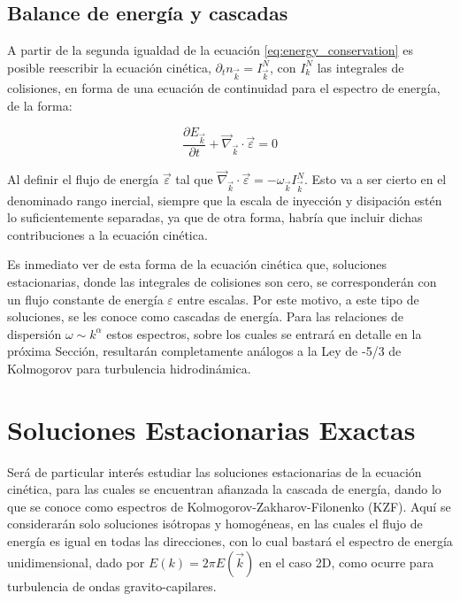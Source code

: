 \subsection{Balance de energía y cascadas} 
A partir de la segunda igualdad de la ecuación \eqref{eq:energy_conservation} es posible reescribir la ecuación cinética, $\partial_t n_{\vec k} = I_{\vec k}^N$, con $I_k^N$ las integrales de colisiones, en forma de una ecuación de continuidad para el espectro de energía, de la forma: 

\begin{equation}
	\frac{\partial E_{\vec k}}{\partial t} + \vec\nabla_{\vec k}\cdot\vec\varepsilon=0 
	\label{eq:energy_balance} 
\end{equation}

Al definir el flujo de energía $\vec \varepsilon$ tal que $\vec\nabla_{\vec k}\cdot\vec\varepsilon=-\omega_{\vec k}I_{\vec k}^N$. Esto va a ser cierto en el denominado rango inercial, siempre que la escala de inyección y disipación estén lo suficientemente separadas, ya que de otra forma, habría que incluir dichas contribuciones a la ecuación cinética. 

Es inmediato ver de esta forma de la ecuación cinética que, soluciones estacionarias, donde las integrales de colisiones son cero, se corresponderán con un flujo constante de energía $\varepsilon$ entre escalas. Por este motivo, a este tipo de soluciones, se les conoce como cascadas de energía. Para las relaciones de dispersión $\omega\sim k^{\alpha}$ estos espectros, sobre los cuales se entrará en detalle en la próxima Sección, resultarán completamente análogos a la Ley de -5/3 de Kolmogorov para turbulencia hidrodinámica. %


\section{Soluciones Estacionarias Exactas} 
\label{sec:KZF} %
Será de particular interés estudiar las soluciones estacionarias de la ecuación cinética, para las cuales se encuentran afianzada la cascada de energía, dando lo que se conoce como espectros de Kolmogorov-Zakharov-Filonenko (KZF). Aquí se considerarán solo soluciones isótropas y homogéneas, en las cuales el flujo de energía es igual en todas las direcciones, con lo cual bastará el espectro de energía unidimensional, dado por $E(k)=2\pi E(\vec k)$ en el caso 2D, como ocurre para turbulencia de ondas gravito-capilares. %

